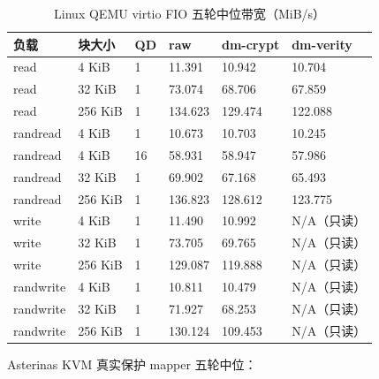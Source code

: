 \begin{table}[H]
    \centering
    \caption{Linux QEMU virtio FIO 五轮中位带宽（MiB/s）}
    \begin{tabular}{p{}p{}p{}p{}p{}p{}}
        \toprule
        \textbf{负载} & \textbf{块大小} & \textbf{QD} & \textbf{raw} & \textbf{dm-crypt} & \textbf{dm-verity} \\
        \midrule
        read & 4 KiB & 1 & 11.391 & 10.942 & 10.704 \\
        read & 32 KiB & 1 & 73.074 & 68.706 & 67.859 \\
        read & 256 KiB & 1 & 134.623 & 129.474 & 122.088 \\
        randread & 4 KiB & 1 & 10.673 & 10.703 & 10.245 \\
        randread & 4 KiB & 16 & 58.931 & 58.947 & 57.986 \\
        randread & 32 KiB & 1 & 69.902 & 67.168 & 65.493 \\
        randread & 256 KiB & 1 & 136.823 & 128.612 & 123.775 \\
        write & 4 KiB & 1 & 11.490 & 10.992 & N/A（只读） \\
        write & 32 KiB & 1 & 73.705 & 69.765 & N/A（只读） \\
        write & 256 KiB & 1 & 129.087 & 119.888 & N/A（只读） \\
        randwrite & 4 KiB & 1 & 10.811 & 10.479 & N/A（只读） \\
        randwrite & 32 KiB & 1 & 71.927 & 68.253 & N/A（只读） \\
        randwrite & 256 KiB & 1 & 130.124 & 109.453 & N/A（只读） \\
        \bottomrule
    \end{tabular}
\end{table}

Asterinas KVM 真实保护 mapper 五轮中位：

